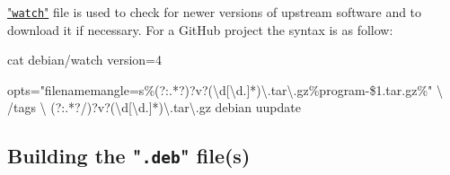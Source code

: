 \href{https://wiki.debian.org/debian/watch}{"\texttt{watch}"} file is used to check for newer versions of upstream software and to download it if necessary. 
For a GitHub project the syntax is as follow:
{\footnotesize{
\begin{script}
 cat debian/watch
version=4

opts="filenamemangle=s\%(?:.*?)?v?(\textbackslash{d}[\textbackslash{d}.]*)\textbackslash{.}tar\textbackslash{.}gz\%program-\$1.tar.gz\%" \textbackslash
   \gitprog/tags \textbackslash
   (?:.*?/)?v?(\textbackslash{d}[\textbackslash{d}.]*)\textbackslash{.}tar\textbackslash{.}gz debian uupdate
\end{script}
}}

\subsection{Building the "\texttt{.deb}" file(s)}

